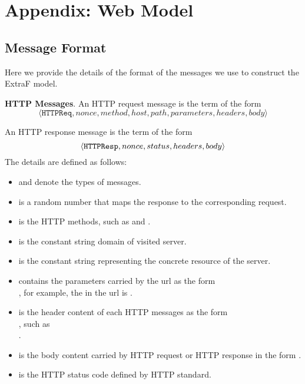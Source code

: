 \newpage
\appendix
\section{Appendix: Web Model}
\subsection{Message Format}
Here we provide the details of the format of the messages we use to construct the ExtraF model.

\vspace{1mm}\noindent\textbf{HTTP Messages}.
An HTTP request message is the term of the form
\vspace{-3mm}
\begin{equation*}
\langle \mathtt{HTTPReq}, nonce, method, host, path, parameters, headers, body\rangle
\end{equation*}

An HTTP response message is the term of the form
\vspace{-2mm}
\begin{equation*}
    \langle {{}\mathtt{HTTPResp}, nonce, status, headers, body} \rangle
\end{equation*}
 The details are defined as follows:
 \begin{itemize}
 \item {} and  denote the types of messages.
 \item {} is a random number that maps the response to the corresponding request.
 \item {} is the HTTP methods, such as  and .
 \item {} is the constant string domain of visited server.
 \item {} is the constant string representing the concrete resource of the server.
 \item {} contains the parameters carried by the url as the form \\ , for example, the  in the url   is .
 \item {} is the header content of each HTTP messages as the form \\ , such as \\  .
 \item {} is the body content carried by HTTP  request or HTTP response in the form .
  \item {} is the HTTP status code defined by HTTP standard.
 \end{itemize}


